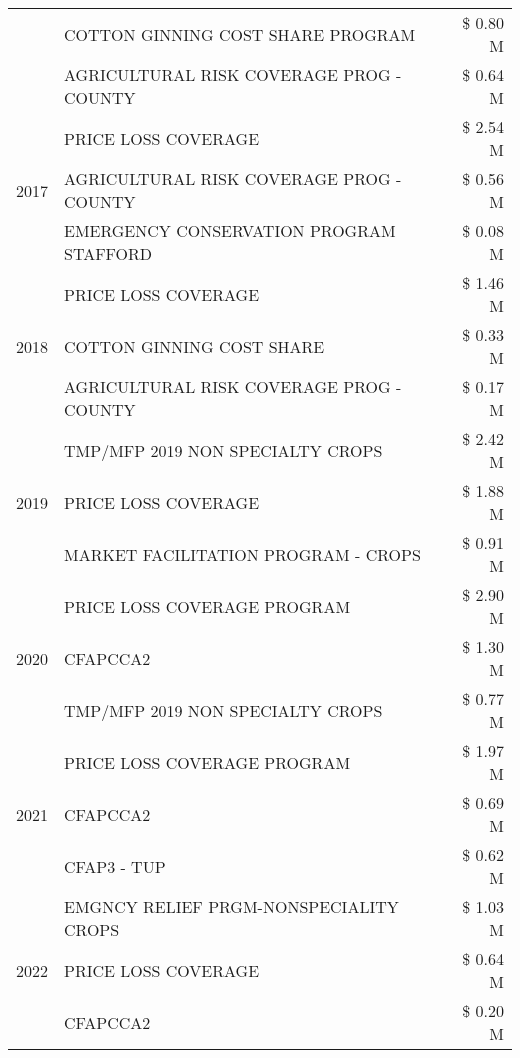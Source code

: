 \begin{tabular}{llr}
 & COTTON GINNING COST SHARE PROGRAM & \$ 0.80 M \\
 & AGRICULTURAL RISK COVERAGE PROG - COUNTY & \$ 0.64 M \\
\cline{1-3}
\multirow[t]{3}{*}{2017} & PRICE LOSS COVERAGE & \$ 2.54 M \\
 & AGRICULTURAL RISK COVERAGE PROG - COUNTY & \$ 0.56 M \\
 & EMERGENCY CONSERVATION PROGRAM STAFFORD & \$ 0.08 M \\
\cline{1-3}
\multirow[t]{3}{*}{2018} & PRICE LOSS COVERAGE & \$ 1.46 M \\
 & COTTON GINNING COST SHARE & \$ 0.33 M \\
 & AGRICULTURAL RISK COVERAGE PROG - COUNTY & \$ 0.17 M \\
\cline{1-3}
\multirow[t]{3}{*}{2019} & TMP/MFP 2019 NON SPECIALTY CROPS & \$ 2.42 M \\
 & PRICE LOSS COVERAGE & \$ 1.88 M \\
 & MARKET FACILITATION PROGRAM - CROPS & \$ 0.91 M \\
\cline{1-3}
\multirow[t]{3}{*}{2020} & PRICE LOSS COVERAGE PROGRAM & \$ 2.90 M \\
 & CFAPCCA2 & \$ 1.30 M \\
 & TMP/MFP 2019 NON SPECIALTY CROPS & \$ 0.77 M \\
\cline{1-3}
\multirow[t]{3}{*}{2021} & PRICE LOSS COVERAGE PROGRAM & \$ 1.97 M \\
 & CFAPCCA2 & \$ 0.69 M \\
 & CFAP3 - TUP & \$ 0.62 M \\
\cline{1-3}
\multirow[t]{3}{*}{2022} & EMGNCY RELIEF PRGM-NONSPECIALITY CROPS & \$ 1.03 M \\
 & PRICE LOSS COVERAGE & \$ 0.64 M \\
 & CFAPCCA2 & \$ 0.20 M \\
\cline{1-3}
\bottomrule
\end{tabular}
